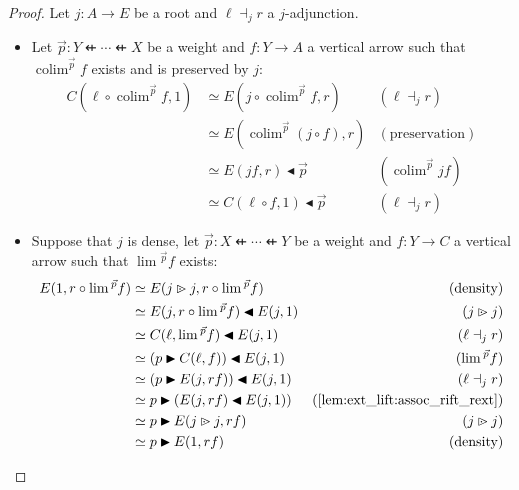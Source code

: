 \documentclass[10pt,a4paper]{article}
\newcommand{\dfrom}{\nvleftarrow}
\newcommand{\plext}{\mathbin{{\rhd}\mathclap{\mspace{-17.5mu}\cdot}}}
\newcommand{\rext}{\mathbin{\blacktriangleright}}
\newcommand{\rift}{\mathbin{\blacktriangleleft}}
\DeclareMathOperator{\colim}{colim}
\theoremstyle{plain}
\theoremstyle{definition}
\theoremstyle{remark}
\begin{document}
\begin{proof}
    Let $j: A \to E$ be a root and $\ell \dashv_j r$ a $j$-adjunction.
    \begin{itemize}
        \item Let $\vec{p} : Y \dfrom \cdots \dfrom X$ be a weight and $f : Y \to A$ a vertical arrow such that $\colim^{\vec{p}}f$ exists and is preserved by $j$:
            \begin{align*}
                C(\ell\circ\colim^{\vec{p}}f, 1) &\simeq E(j\circ\colim^{\vec{p}}f, r) & (\ell\dashv_jr)\\
                                                 &\simeq E(\colim^{\vec{p}}(j\circ f), r) & (\text{preservation})\\
                                                 &\simeq E(jf, r) \rift \vec{p} & (\colim^{\vec p}{jf})\\
                                                 &\simeq C(\ell\circ f, 1) \rift \vec{p} & (\ell\dashv_jr)
            \end{align*}
        \item Suppose that $j$ is dense, let $\vec{p} : X \dfrom \cdots \dfrom Y$ be a weight and $f : Y \to C$ a vertical arrow such that $\lim{}^{\vec{p}}f$ exists:
            \begin{align*}
                E(1, r\circ\lim{}^{\vec{p}}f) &\simeq E(j \plext j, r\circ\lim{}^{\vec{p}}f) & (\text{density})\\
                                              &\simeq E(j , r\circ\lim{}^{\vec{p}}f) \rift E(j, 1) & (j\plext j)\\
                                              &\simeq C(\ell, \lim{}^{\vec{p}}f) \rift E(j, 1) & (\ell\dashv_jr)\\
                                              &\simeq (p\rext C(\ell, f)) \rift E(j, 1) & (\lim{}^{\vec p}f)\\
                                              &\simeq (p\rext E(j, rf)) \rift E(j, 1) & (\ell\dashv_jr)\\
                                              &\simeq p \rext (E(j, rf) \rift E(j, 1)) & (\ref{lem:ext_lift:assoc_rift_rext})\\
                                              &\simeq p \rext E(j\plext j, rf) & (j\plext j)\\
                                              &\simeq p \rext E(1, rf) & (\text{density})
            \end{align*}
    \end{itemize}
\end{proof}
\end{document}

